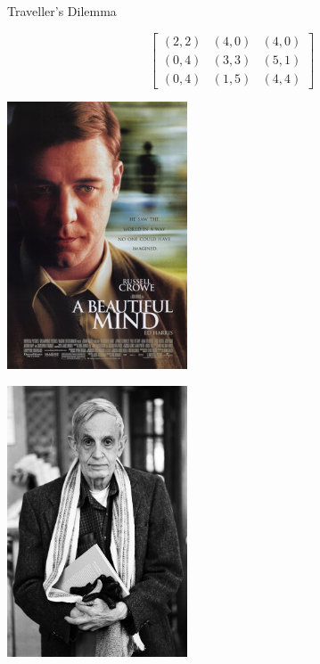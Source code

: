 \documentclass{beamer}
\begin{document}
\begin{frame}
\begin{center}
\Huge{Traveller's Dilemma}
\end{center}
\end{frame}

\begin{frame}{}
 \Huge
 \[
\begin{bmatrix}
  (2,2) & (4,0) & (4,0)  \\
  (0,4) & (3,3) & (5,1) \\
  (0,4) & (1,5) & (4,4)
\end{bmatrix}
\]
\end{frame}

\begin{frame}
    \begin{center}
        \includegraphics[width=0.4\textwidth]{static/russel.jpg}
    \end{center}
\end{frame}

\begin{frame}
    \begin{center}
        \includegraphics[width=0.4\textwidth]{static/john_nash.jpg}
    \end{center}
\end{frame}
\end{document}
